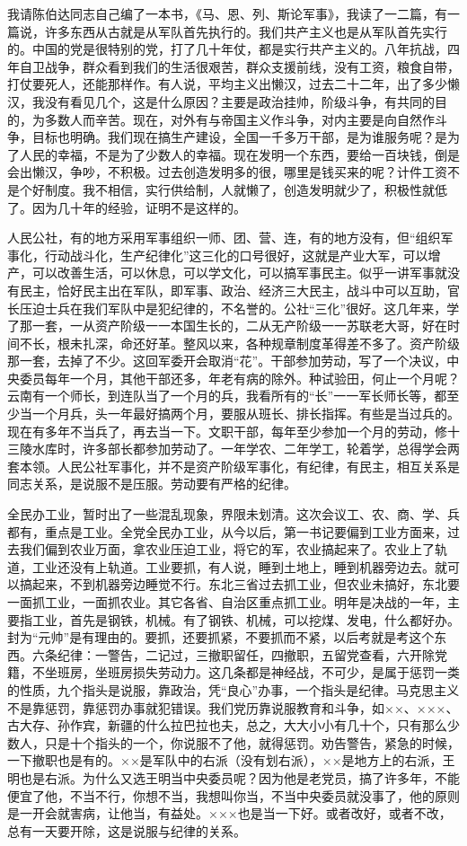 我请陈伯达同志自己编了一本书，《马、恩、列、斯论军事》，我读了一二篇，有一篇说，许多东西从古就是从军队首先执行的。我们共产主义也是从军队首先实行的。中国的党是很特别的党，打了几十年仗，都是实行共产主义的。八年抗战，四年自卫战争，群众看到我们的生活很艰苦，群众支援前线，没有工资，粮食自带，打仗要死人，还能那样作。有人说，平均主义出懒汉，过去二十二年，出了多少懒汉，我没有看见几个，这是什么原因？主要是政治挂帅，阶级斗争，有共同的目的，为多数人而辛苦。现在，对外有与帝国主义作斗争，对内主要是向自然作斗争，目标也明确。我们现在搞生产建设，全国一千多万干部，是为谁服务呢？是为了人民的幸福，不是为了少数人的幸福。现在发明一个东西，要给一百块钱，倒是会出懒汉，争吵，不积极。过去创造发明多的很，哪里是钱买来的呢？计件工资不是个好制度。我不相信，实行供给制，人就懒了，创造发明就少了，积极性就低了。因为几十年的经验，证明不是这样的。

人民公社，有的地方采用军事组织一师、团、营、连，有的地方没有，但“组织军事化，行动战斗化，生产纪律化”这三化的口号很好，这就是产业大军，可以增产，可以改善生活，可以休息，可以学文化，可以搞军事民主。似乎一讲军事就没有民主，恰好民主出在军队，即军事、政治、经济三大民主，战斗中可以互助，官长压迫士兵在我们军队中是犯纪律的，不名誉的。公社“三化”很好。这几年来，学了那一套，一从资产阶级一一本国生长的，二从无产阶级一一苏联老大哥，好在时间不长，根未扎深，命还好革。整风以来，各种规章制度革得差不多了。资产阶级那一套，去掉了不少。这回军委开会取消“花”。干部参加劳动，写了一个决议，中央委员每年一个月，其他干部还多，年老有病的除外。种试验田，何止一个月呢？云南有一个师长，到连队当了一个月的兵，我看所有的“长”一一军长师长等，都至少当一个月兵，头一年最好搞两个月，要服从班长、排长指挥。有些是当过兵的。现在有多年不当兵了，再去当一下。文职干部，每年至少参加一个月的劳动，修十三陵水库时，许多部长都参加劳动了。一年学农、二年学工，轮着学，总得学会两套本领。人民公社军事化，并不是资产阶级军事化，有纪律，有民主，相互关系是同志关系，是说服不是压服。劳动要有严格的纪律。

全民办工业，暂时出了一些混乱现象，界限未划清。这次会议工、农、商、学、兵都有，重点是工业。全党全民办工业，从今以后，第一书记要偏到工业方面来，过去我们偏到农业万面，拿农业压迫工业，将它的军，农业搞起来了。农业上了轨道，工业还没有上轨道。工业要抓，有人说，睡到土地上，睡到机器旁边去。就可以搞起来，不到机器旁边睡觉不行。东北三省过去抓工业，但农业未搞好，东北要一面抓工业，一面抓农业。其它各省、自治区重点抓工业。明年是决战的一年，主要指工业，首先是钢铁，机械。有了钢铁、机械，可以挖煤、发电，什么都好办。封为“元帅”是有理由的。要抓，还要抓紧，不要抓而不紧，以后考就是考这个东西。六条纪律：一警告，二记过，三撤职留任，四撤职，五留党查看，六开除党籍，不坐班房，坐班房损失劳动力。这几条都是神经战，不可少，是属于惩罚一类的性质，九个指头是说服，靠政治，凭“良心”办事，一个指头是纪律。马克思主义不是靠惩罚，靠惩罚办事就犯错误。我们党历靠说服教育和斗争，如××、×××、古大存、孙作宾，新疆的什么拉巴拉也夫，总之，大大小小有几十个，只有那么少数人，只是十个指头的一个，你说服不了他，就得惩罚。劝告警告，紧急的时候，一下撤职也是有的。××是军队中的右派（没有划右派），××是地方上的右派，王明也是右派。为什么又选王明当中央委员呢？因为他是老党员，搞了许多年，不能便宜了他，不当不行，你想不当，我想叫你当，不当中央委员就没事了，他的原则是一开会就害病，让他当，有益处。×××也是当一下好。或者改好，或者不改，总有一天要开除，这是说服与纪律的关系。

